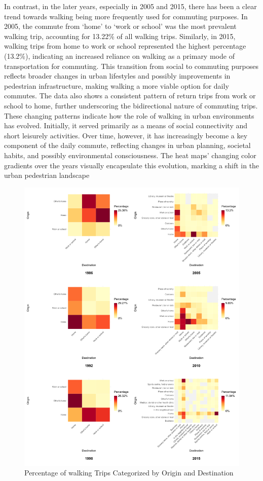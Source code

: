 \documentclass[
11pt, %
oneside, %
english, %
singlespacing, %
]{macthesis} %
\begin{document}
In contrast, in the later years, especially in 2005 and 2015, there has been a clear trend towards walking being more frequently used for commuting purposes. In 2005, the commute from `home' to `work or school' was the most prevalent walking trip, accounting for 13.22\% of all walking trips. Similarly, in 2015, walking trips from home to work or school represented the highest percentage (13.2\%), indicating an increased reliance on walking as a primary mode of transportation for commuting. This transition from social to commuting purposes reflects broader changes in urban lifestyles and possibly improvements in pedestrian infrastructure, making walking a more viable option for daily commutes. The data also shows a consistent pattern of return trips from work or school to home, further underscoring the bidirectional nature of commuting trips.
These changing patterns indicate how the role of walking in urban environments has evolved. Initially, it served primarily as a means of social connectivity and short leisurely activities. Over time, however, it has increasingly become a key component of the daily commute, reflecting changes in urban planning, societal habits, and possibly environmental consciousness. The heat maps' changing color gradients over the years visually encapsulate this evolution, marking a shift in the urban pedestrian landscape

\begin{figure}

{\centering \includegraphics[width=1\linewidth]{figure/ch03_fig_01} 

}

\caption{Percentage of walking Trips Categorized by Origin and Destination}\label{fig:heat-w}
\end{figure}
\end{document}
